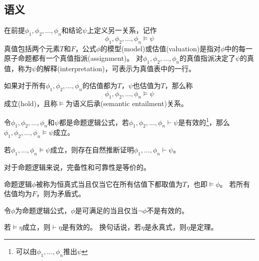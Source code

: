 \subsection{语义}
\begin{definition}[模型(model)]
在前提$\phi_1,\phi_2,\ldots,\phi_n$和结论$\psi$上定义另一关系，记作
\[\phi_1,\phi_2,\ldots,\phi_n\models\psi\]
真值包括两个元素$T$和$F$，公式$\phi$的模型(model)或估值(valuation)是指对$\phi$中的每一原子命题都有一个真值指派(assignment)。
对$\phi_1,\phi_2,\ldots,\phi_n$的真值指派决定了$\psi$的真值，称为$\psi$的解释(interpretation)，可表示为真值表中的一行。

如果对于所有$\phi_1,\phi_2,\ldots,\phi_n$的估值都为$T$，$\psi$也估值为$T$，那么称
\[\phi_1,\phi_2,\ldots,\phi_n\models\psi\]
成立(hold)，且称$\models$为语义后承(semantic entailment)关系。
\end{definition}
\begin{theorem}
令$\phi_1,\phi_2,\ldots,\phi_n$和$\psi$都是命题逻辑公式，若$\phi_1,\phi_2,\ldots,\phi_n\vdash\psi$是有效的\footnote{可以由$\phi_1,\ldots,\phi_n$推出$\psi$}，那么$\phi_1,\phi_2,\ldots,\phi_n\models\psi$成立。
\end{theorem}
\begin{theorem}
若$\phi_1,\ldots,\phi_n\models\psi$成立，则存在自然推断证明$\phi_1,\ldots,\phi_n\vdash\psi$。
\end{theorem}
\begin{theorem}
对于命题逻辑来说，完备性和可靠性是等价的。
\end{theorem}

\begin{definition}
命题逻辑$\phi$被称为恒真式当且仅当它在所有估值下都取值为$T$，也即$\models\phi$。
若所有估值均为$F$，则为矛盾式。
\end{definition}
\begin{definition}
令$\phi$为命题逻辑公式，$\phi$是可满足的当且仅当$\lnot\phi$不是有效的。
\end{definition}
\begin{theorem}
若$\models\eta$成立，则$\vdash\eta$是有效的。
换句话说，若$\eta$是永真式，则$\eta$是定理。
\end{theorem}

